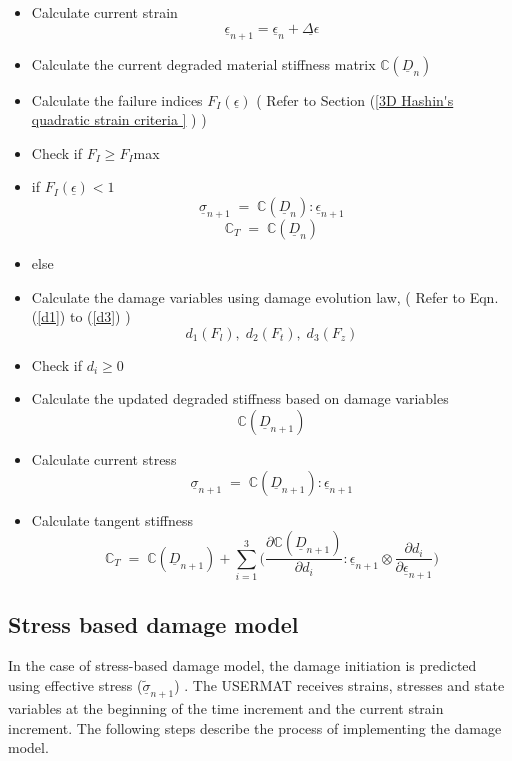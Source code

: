 \documentclass[12pt,a4paper,twoside,openright]{report}
\begin{document}
\begin{itemize}
\item Calculate current strain \textbf{$$ \underline{\epsilon}_{n+1} = \underline{\epsilon}_{n} + \underline{\Delta \epsilon} $$}
\item Calculate the current degraded material stiffness matrix  \textbf{$\mathbb{C}(\underline{D}_{n})$}
\item Calculate the failure indices \textbf{$F_{I}(\underline{\epsilon})$} \;\; ( Refer to Section (\ref{3D Hashin's quadratic strain criteria } ) )
\item[] Check if $F_{I} \geq F_{I}$max
\item if \textbf{$F_{I}(\underline{\epsilon})<1$} \textbf{$$\underline{\sigma}_{n+1} \; = \; \mathbb{C}(\underline{D}_{n}) :  \underline{\epsilon}_{n+1} $$} \textbf{$$\mathbb{C}_{T} \; = \; \mathbb{C}(\underline{D}_{n})$$}
\item else
\item[]  Calculate the damage variables using damage evolution law, \;\; ( Refer to Eqn. (\ref{d1}) to (\ref{d3}) ) \textbf{$$d_{1}(F_{l}),\;d_{2}(F_{t}),\;d_{3}(F_{z})$$}
\item[]  Check if $d_{i} \geq 0 $ 
\item[]  Calculate the updated degraded stiffness based on damage variables \textbf{$$\mathbb{C}(\underline{D}_{n+1})$$}
\item[]  Calculate current stress  \textbf{$$\underline{\sigma}_{n+1} \; = \; \mathbb{C}(\underline{D}_{n+1}) :  \underline{\epsilon}_{n+1} $$}
\item[] Calculate tangent stiffness \textbf{$$\mathbb{C}_{T}  \; = \;\mathbb{C}(\underline{D}_{n+1}) + \sum_{i = 1}^{3} \Big( \frac{\partial \mathbb{C}(\underline{D}_{n+1}) }{\partial d_{i}} : \underline{\epsilon}_{n+1} \otimes \frac{\partial d_{i}}{\partial \underline{\epsilon}_{n+1} }\Big)$$}
	
\end{itemize} 


\subsection{Stress based damage model}\label{Stress based damage model}
\indent\indent\indent  In the case of stress-based damage model, the damage initiation is predicted using effective stress ($\underline{\tilde{\sigma}}_{n+1}$) \citep{jiang2018evaluations}.  The USERMAT receives strains, stresses and state variables at the beginning of the time increment and the current strain increment. The following steps describe the process of implementing the damage model.
\end{document}
